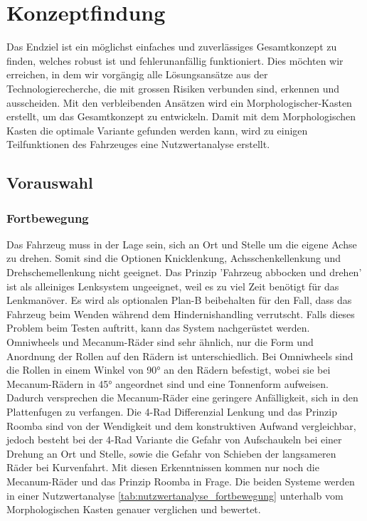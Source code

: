 \documentclass[../main.tex]{subfiles}
\begin{document}
\newpage
\section{Konzeptfindung}

Das Endziel ist ein möglichst einfaches und zuverlässiges Gesamtkonzept zu finden, welches robust ist und fehlerunanfällig funktioniert. Dies möchten wir erreichen, in dem wir vorgängig alle Lösungsansätze aus der Technologierecherche, die mit grossen Risiken verbunden sind, erkennen und ausscheiden. Mit den verbleibenden Ansätzen wird ein Morphologischer-Kasten erstellt, um das Gesamtkonzept zu entwickeln. Damit mit dem Morphologischen Kasten die optimale Variante gefunden werden kann, wird zu einigen Teilfunktionen des Fahrzeuges eine Nutzwertanalyse erstellt.

\subsection{Vorauswahl}
    \subsubsection{Fortbewegung}
    Das Fahrzeug muss in der Lage sein, sich an Ort und Stelle um die eigene Achse zu drehen. Somit sind die Optionen Knicklenkung, Achsschenkellenkung und Drehschemellenkung nicht geeignet.
    Das Prinzip 'Fahrzeug abbocken und drehen' ist als alleiniges Lenksystem ungeeignet, weil es zu viel Zeit benötigt für das Lenkmanöver. Es wird als optionalen Plan-B beibehalten für den Fall, dass das Fahrzeug beim Wenden während dem Hindernishandling verrutscht. Falls dieses Problem beim Testen auftritt, kann das System nachgerüstet werden.
    Omniwheels und Mecanum-Räder sind sehr ähnlich, nur die Form und Anordnung der Rollen auf den Rädern ist unterschiedlich. Bei Omniwheels sind die Rollen in einem Winkel von 90° an den Rädern befestigt, wobei sie bei Mecanum-Rädern in 45° angeordnet sind und eine Tonnenform aufweisen. Dadurch versprechen die Mecanum-Räder eine geringere Anfälligkeit, sich in den Plattenfugen zu verfangen. Die 4-Rad Differenzial Lenkung und das Prinzip Roomba sind von der Wendigkeit und dem konstruktiven Aufwand vergleichbar, jedoch besteht bei der 4-Rad Variante die Gefahr von Aufschaukeln bei einer Drehung an Ort und Stelle, sowie die Gefahr von Schieben der langsameren Räder bei Kurvenfahrt. Mit diesen Erkenntnissen kommen nur noch die Mecanum-Räder und das Prinzip Roomba in Frage. Die beiden Systeme werden in einer Nutzwertanalyse \ref{tab:nutzwertanalyse_fortbewegung} unterhalb vom Morphologischen Kasten genauer verglichen und bewertet.
        
\end{document}
